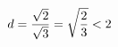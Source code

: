\documentclass[preview]{standalone}
\begin{document}
\begin{align*}
\special{dvisvgm:raw <g id='unique000'>}d=\dfrac{\sqrt{2}}{\sqrt{3}}=\sqrt{\dfrac{2}{3}}<2\special{dvisvgm:raw </g>}
\end{align*}
\end{document}
